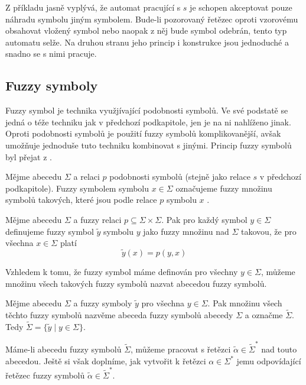 \documentclass[a4paper,10pt]{article}
\begin{document}
Z příkladu jasně vyplývá, že automat pracující s $s$ je schopen akceptovat pouze náhradu symbolu jiným symbolem. Bude-li pozorovaný řetězec oproti vzorovému obsahovat vložený symbol nebo naopak z něj bude symbol odebrán, tento typ automatu selže. Na druhou stranu jeho princip i konstrukce jsou jednoduché a snadno se s nimi pracuje.

\subsection{Fuzzy symboly}
Fuzzy symbol je technika využjívající podobnosti symbolů. Ve své podstatě se jedná o téže techniku jak v předchozí podkapitole, jen je na ni nahlíženo jinak. Oproti podobnosti symbolů je použití fuzzy symbolů komplikovanější, avšak umožňuje jednoduše tuto techniku kombinovat s jinými. Princip fuzzy symbolů byl přejat z \cite{Ech-DefSyssConPre}.

Mějme abecedu $\Sigma$ a relaci $p$ podobnosti symbolů (stejně jako relace $s$ v předchozí podkapitole). Fuzzy symbolem symbolu $x \in \Sigma$ označujeme fuzzy množinu symbolů takových, které jsou podle relace $p$ symbolu $x$ .

\begin{definition}
Mějme abecedu $\Sigma$ a fuzzy relaci $p \subseteq \Sigma \times \Sigma$. Pak pro každý symbol $y \in \Sigma$ definujeme fuzzy symbol $\widetilde{y}$ symbolu $y$ jako fuzzy množinu nad $\Sigma$ takovou, že pro všechna $x \in \Sigma$ platí
$$
\widetilde{y}(x) = p(y, x)
$$
\end{definition}

Vzhledem k tomu, že fuzzy symbol máme definován pro všechny $y \in \Sigma$, můžeme množinu všech takových fuzzy symbolů nazvat abecedou fuzzy symbolů.

\begin{definition}
Mějme abecedu $\Sigma$ a fuzzy symboly $\widetilde{y}$ pro všechna $y \in \Sigma$. Pak množinu všech těchto fuzzy symbolů nazvěme abeceda fuzzy symbolů abecedy $\Sigma$ a označme $\widetilde{\Sigma}$. Tedy $\widetilde{\Sigma} = \{ \widetilde{y} \mid y \in \Sigma \}$.
\end{definition}

Máme-li abecedu fuzzy symbolů $\widetilde{\Sigma}$, můžeme pracovat s řetězci $\widetilde{\alpha} \in \widetilde{\Sigma}^*$ nad touto abecedou. Ještě si však doplníme, jak vytvořit k řetězci $\alpha \in \Sigma^*$ jemu odpovídající řetězec fuzzy symbolů $\widetilde{\alpha} \in \widetilde{\Sigma}^*$.
\end{document}
